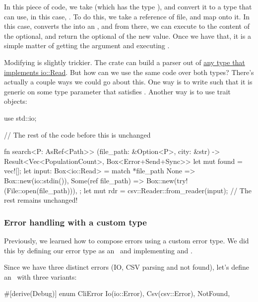 In this piece of code, we take  (which has the type ), and convert it to a type that 
 can use, in this case, . To do this, we take a reference of file, and map 
 onto it. In this case,  converts the  into an , 
and from there, we can execute  to the content of the optional, and return the optional of the new value. 
Once we have that, it is a simple matter of getting the  argument and executing .

\blank

Modifying  is slightly trickier. The  crate can build a parser out of 
\href{http://burntsushi.net/rustdoc/csv/struct.Reader.html\#method.from\_reader}{any type that implements io::Read}. But 
how can we use the same code over both types? There's actually a couple ways we could go about this. One way is to write 
 such that it is generic on some type parameter  that satisfies . Another way is to 
use trait objects:

\begin{rustc}
use std::io;

// The rest of the code before this is unchanged

fn search<P: AsRef<Path>>
         (file_path: &Option<P>, city: &str)
         -> Result<Vec<PopulationCount>, Box<Error+Send+Sync>> {
    let mut found = vec![];
    let input: Box<io::Read> = match *file_path {
        None => Box::new(io::stdin()),
        Some(ref file_path) => Box::new(try!(File::open(file_path))),
    };
    let mut rdr = csv::Reader::from_reader(input);
    // The rest remains unchanged!
}
\end{rustc}

\subsubsection*{Error handling with a custom type}

Previously, we learned how to compose errors using a custom error type. We did this by defining our error type as an 
\enum\ and implementing  and .

\blank

Since we have three distinct errors (IO, CSV parsing and not found), let's define an \enum\ with three variants:

\begin{rustc}
#[derive(Debug)]
enum CliError {
    Io(io::Error),
    Csv(csv::Error),
    NotFound,
}
\end{rustc}

